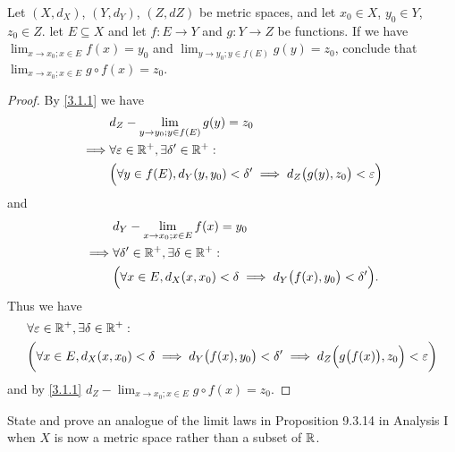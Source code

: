 \begin{ex}\label{ex:3.1.5}
  Let \((X, d_X)\), \((Y, d_Y)\), \((Z, d Z)\) be metric spaces, and let \(x_0 \in X\), \(y_0 \in Y\), \(z_0 \in Z\).
  let \(E \subseteq X\) and let \(f : E \to Y\) and \(g : Y \to Z\) be functions.
  If we have \(\lim_{x \to x_0 ; x \in E} f(x) = y_0\) and \(\lim_{y \to y_0 ; y \in f(E)} g(y) = z_0\), conclude that \(\lim_{x \to x_0 ; x \in E} g \circ f(x) = z_0\).
\end{ex}

\begin{proof}
  By \cref{3.1.1} we have
  \begin{align*}
             & d_Z - \lim_{y \to y_0 ; y \in f(E)} g(y) = z_0                                                    \\
    \implies & \forall \varepsilon \in \mathbb{R}^+, \exists \delta' \in \mathbb{R}^+ :                                          \\
             & \Big(\forall y \in f(E), d_Y(y, y_0) < \delta' \implies d_Z\big(g(y), z_0\big) < \varepsilon\Big)
  \end{align*}
  and
  \begin{align*}
             & d_Y - \lim_{x \to x_0 ; x \in E} f(x) = y_0                                                \\
    \implies & \forall \delta' \in \mathbb{R}^+, \exists \delta \in \mathbb{R}^+ :                                        \\
             & \Big(\forall x \in E, d_X(x, x_0) < \delta \implies d_Y\big(f(x), y_0\big) < \delta'\Big).
  \end{align*}
  Thus we have
  \begin{align*}
     & \forall \varepsilon \in \mathbb{R}^+, \exists \delta \in \mathbb{R}^+ :                                                                                              \\
     & \bigg(\forall x \in E, d_X(x, x_0) < \delta \implies d_Y\big(f(x), y_0\big) < \delta' \implies d_Z\Big(g\big(f(x)\big), z_0\Big) < \varepsilon\bigg)
  \end{align*}
  and by \cref{3.1.1} \(d_Z - \lim_{x \to x_0 ; x \in E} g \circ f(x) = z_0\).
\end{proof}

\begin{ex}\label{ex:3.1.6}
  State and prove an analogue of the limit laws in Proposition 9.3.14 in Analysis I when \(X\) is now a metric space rather than a subset of \(\mathbb{R}\).
\end{ex}

